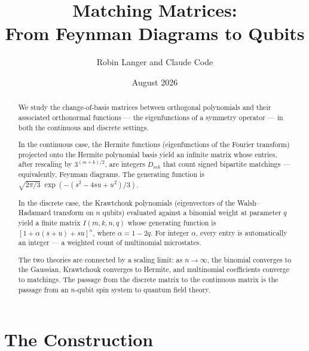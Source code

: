 \documentclass[11pt,a4paper]{article}
\title{\textbf{Matching Matrices:\\
From Feynman Diagrams to Qubits}}
\author{Robin Langer and Claude Code}
\date{August 2026}
\theoremstyle{plain}
\theoremstyle{definition}
\begin{document}
\maketitle

\begin{abstract}
We study the change-of-basis matrices between orthogonal polynomials
and their associated orthonormal functions --- the eigenfunctions of
a symmetry operator --- in both the continuous and discrete settings.

In the continuous case, the Hermite functions (eigenfunctions of the
Fourier transform) projected onto the Hermite polynomial basis yield
an infinite matrix whose entries, after rescaling by $3^{(m+k)/2}$,
are integers $D_{mk}$ that count signed bipartite matchings ---
equivalently, Feynman diagrams. The generating function is
$\sqrt{2\pi/3}\;\exp(-(s^2 - 4su + u^2)/3)$.

In the discrete case, the Krawtchouk polynomials (eigenvectors of
the Walsh--Hadamard transform on $n$ qubits) evaluated against a
binomial weight at parameter $q$ yield a finite matrix $I(m,k,n,q)$
whose generating function is $[1 + \alpha(s+u) + su]^n$, where
$\alpha = 1 - 2q$. For integer $\alpha$, every entry is
automatically an integer --- a weighted count of multinomial
microstates.

The two theories are connected by a scaling limit: as $n \to \infty$,
the binomial converges to the Gaussian, Krawtchouk converges to
Hermite, and multinomial coefficients converge to matchings. The
passage from the discrete matrix to the continuous matrix is the
passage from an $n$-qubit spin system to quantum field theory.
\end{abstract}

\section{The Construction}
\end{document}
